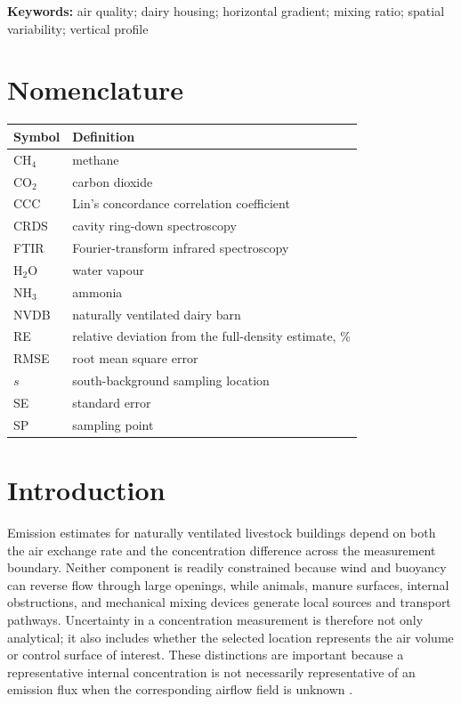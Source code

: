 \documentclass[12pt,a4paper]{article}
\begin{document}
\noindent\textbf{Keywords:}
air quality; dairy housing; horizontal gradient; mixing ratio; spatial
variability; vertical profile

\section*{Nomenclature}

\begin{tabular}{>{\raggedright\arraybackslash}p{2.2cm}
                >{\raggedright\arraybackslash}p{10.8cm}}
\toprule
Symbol & Definition\\
\midrule
\(\mathrm{CH_4}\) & methane\\
\(\mathrm{CO_2}\) & carbon dioxide\\
CCC & Lin's concordance correlation coefficient\\
CRDS & cavity ring-down spectroscopy\\
FTIR & Fourier-transform infrared spectroscopy\\
\(\mathrm{H_2O}\) & water vapour\\
\(\mathrm{NH_3}\) & ammonia\\
NVDB & naturally ventilated dairy barn\\
RE & relative deviation from the full-density estimate, \%\\
RMSE & root mean square error\\
\(s\) & south-background sampling location\\
SE & standard error\\
SP & sampling point\\
\bottomrule
\end{tabular}

\section{Introduction}

Emission estimates for naturally ventilated livestock buildings depend on
both the air exchange rate and the concentration difference across the
measurement boundary. Neither component is readily constrained because wind
and buoyancy can reverse flow through large openings, while animals, manure
surfaces, internal obstructions, and mechanical mixing devices generate local
sources and transport pathways. Uncertainty in a concentration measurement is
therefore not only analytical; it also includes whether the selected location
represents the air volume or control surface of interest. These distinctions
are important because a representative internal concentration is not
necessarily representative of an emission flux when the corresponding airflow
field is unknown \citep{Calvet2013,Ogink2013}.
\end{document}

